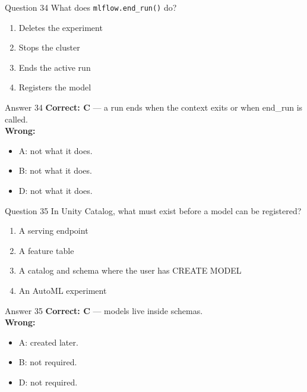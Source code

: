 \documentclass[aspectratio=169,11pt]{beamer}
\begin{document}
\begin{frame}{Question 34}
What does \texttt{mlflow.end\_run()} do?
\begin{enumerate}[label=\Alph*.]
\item Deletes the experiment
\item Stops the cluster
\item Ends the active run
\item Registers the model
\end{enumerate}
\end{frame}
\begin{frame}{Answer 34}
\textbf{Correct: C} --- a run ends when the context exits or when end\_run is called.\\
\vspace{0.5em}
\textbf{Wrong:}
\begin{itemize}
\item A: not what it does.
\item B: not what it does.
\item D: not what it does.
\end{itemize}
\end{frame}

\begin{frame}{Question 35}
In Unity Catalog, what must exist before a model can be registered?
\begin{enumerate}[label=\Alph*.]
\item A serving endpoint
\item A feature table
\item A catalog and schema where the user has CREATE MODEL
\item An AutoML experiment
\end{enumerate}
\end{frame}
\begin{frame}{Answer 35}
\textbf{Correct: C} --- models live inside schemas.\\
\vspace{0.5em}
\textbf{Wrong:}
\begin{itemize}
\item A: created later.
\item B: not required.
\item D: not required.
\end{itemize}
\end{frame}
\end{document}
